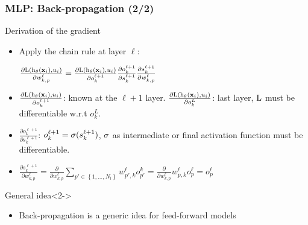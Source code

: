 \begin{frame}
  \frametitle{\acl{MLP}: Back-propagation (2/2)}
  \begin{block}{Derivation of the gradient}
  \begin{itemize}
    \item Apply the chain rule at layer $\ell$:

    $
    \frac{\partial \mathrm{L} \left ( {\mathrm{h}_{\mathbf{\theta}} \left ( {\mathbf{x}_i} \right ), u_i} \right ) }{\partial w_{k,p}^\ell} =
    \frac{\partial \mathrm{L} \left ( {\mathrm{h}_{\mathbf{\theta}} \left ( {\mathbf{x}_i} \right ), u_i} \right )}{\partial o_k^{\ell+1}} \frac{\partial o_k^{\ell+1}}{\partial s_k^{\ell+1}} \frac{\partial s_k^{\ell+1}}{\partial w_{k,p}^{\ell}}
    $

    \item $\frac{\partial \mathrm{L} \left ( {\mathrm{h}_{\mathbf{\theta}} \left ( {\mathbf{x}_i} \right ), u_i} \right )}{\partial o_k^{\ell+1}}$: known at the $\ell+1$ layer. $\frac{\partial \mathrm{L} \left ( {\mathrm{h}_{\mathbf{\theta}} \left ( {\mathbf{x}_i} \right ), u_i} \right )}{\partial o_k^{L}}$: last layer, $\mathrm{L}$ must be differentiable w.r.t $o_k^{L}$.


    \item $\frac{\partial o_k^{\ell+1}}{\partial s_k^{\ell+1}}$: $o_k^{\ell+1} = \mathrm{\sigma}(s_k^{\ell+1})$, $\mathrm{\sigma}$ as intermediate or final activation function must be differentiable.

    \item $\frac{\partial s_k^{\ell+1}}{\partial w_{k,p}^{\ell}} = \frac{\partial}{\partial w_{k,p}^{\ell}} \sum_{p' \in \left\{1,\ldots,N_l \right\}}  w_{p', k}^{\ell}o_{p'}^{k}= \frac{\partial }{\partial w_{k,p}^{\ell}}  w_{p, k}^{\ell}o_{p}^{\ell}=o_{p}^{\ell}$

    \end{itemize}
  \end{block}

  \begin{block}{General idea}<2->
    \begin{itemize}
    \item Back-propagation is a generic idea for feed-forward models
    \end{itemize}
  \end{block}
\end{frame}
